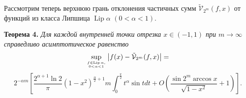 \documentclass[12pt]{book}
\begin{document}





Рассмотрим теперь верхнюю грань отклонения частичных сумм $\tilde{\mathcal{V}}_{2^m}(f,x)$ от функций из класса Липшица $\operatorname{Lip} \alpha$ $(0< \alpha <1)$.

\noindent\textbf{Теорема 4. }\textit{
Для каждой внутренней точки отрезка $x \in (-1, 1)$ при $m \rightarrow \infty$ справедливо асимптотическое равенство
\begin{equation*}
\sup_{f \in \operatorname{Lip}{\alpha}, \atop 0 < \alpha < 1} \left| f(x) - \tilde{\mathcal{V}}_{2^m}(f,x) \right| =
\end{equation*}
\begin{equation*}
\label{sms1thrm4eq}
2^{-\alpha m} \left[
\frac{2^{\alpha+1}\ln{2}}{\pi} \left( 1-x^2 \right)^{\frac{\alpha}{2}+1}m
\int_{0}^{\frac{\pi}{2}} t^{\alpha} \sin{t} dt +
O \left( \frac{\sin{2^{m} \arccos {x}}}{\sqrt{1-x^2}} + 1\right)
\right].
\end{equation*}
}
\end{document}
